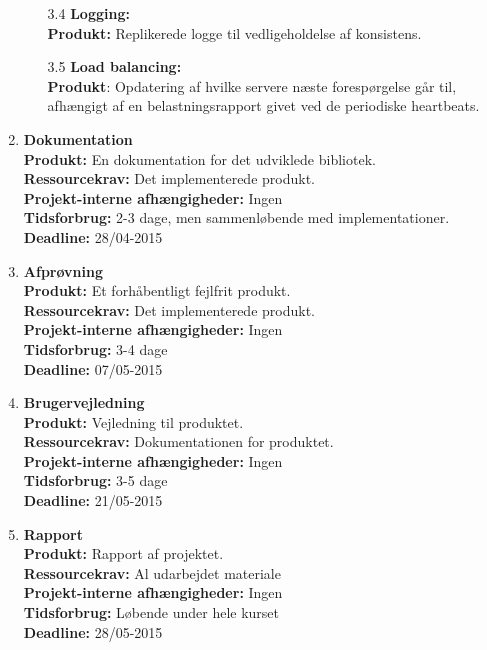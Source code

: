 \documentclass[a4paper,12pt]{article}
\begin{document}
\begin{enumerate}
\begin{enumerate}
\item[3.4] \textbf{Logging:} \\
\textbf{Produkt:} Replikerede logge til vedligeholdelse af konsistens.

\item[3.5] \textbf{Load balancing:} \\
\textbf{Produkt}: Opdatering af hvilke servere næste forespørgelse går til, afhængigt af en belastningsrapport givet ved de periodiske heartbeats.
\end{enumerate}
\item \textbf{Dokumentation} \\
\textbf{Produkt:} En dokumentation for det udviklede bibliotek. \\
\textbf{Ressourcekrav:} Det implementerede produkt. \\
\textbf{Projekt-interne afhængigheder:} Ingen \\
\textbf{Tidsforbrug:} 2-3 dage, men sammenløbende med implementationer. \\
\textbf{Deadline:} 28/04-2015

\item \textbf{Afprøvning} \\
\textbf{Produkt:} Et forhåbentligt fejlfrit produkt. \\
\textbf{Ressourcekrav:} Det implementerede produkt. \\
\textbf{Projekt-interne afhængigheder:} Ingen \\
\textbf{Tidsforbrug:} 3-4 dage \\
\textbf{Deadline:} 07/05-2015

\item \textbf{Brugervejledning} \\
\textbf{Produkt:} Vejledning til produktet. \\
\textbf{Ressourcekrav:} Dokumentationen for produktet. \\
\textbf{Projekt-interne afhængigheder:} Ingen \\
\textbf{Tidsforbrug:} 3-5 dage \\
\textbf{Deadline:} 21/05-2015


\item \textbf{Rapport} \\
\textbf{Produkt:} Rapport af projektet. \\
\textbf{Ressourcekrav:} Al udarbejdet materiale \\
\textbf{Projekt-interne afhængigheder:} Ingen \\
\textbf{Tidsforbrug:} Løbende under hele kurset \\
\textbf{Deadline:} 28/05-2015
\end{enumerate}
\end{document}
